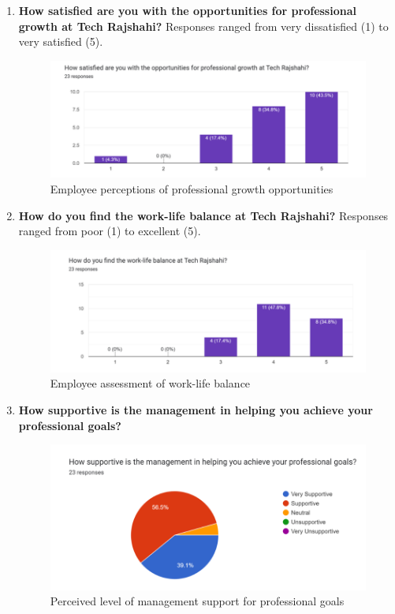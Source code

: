\documentclass[12pt,a4paper]{article}
\begin{document}
\begin{enumerate}
    \newpage
    \item \textbf{How satisfied are you with the opportunities for professional growth at Tech Rajshahi?}  Responses ranged from very dissatisfied (1) to very satisfied (5).
    \begin{figure}[H]
        \centering
        \includegraphics[width=\textwidth]{Fig/pg.png}
        \caption{Employee perceptions of professional growth opportunities}
        \label{fig:professional_growth}
    \end{figure}

    \item \textbf{How do you find the work-life balance at Tech Rajshahi?}  Responses ranged from poor (1) to excellent (5).
    \begin{figure}[H]
        \centering
        \includegraphics[width=\textwidth]{Fig/wlb.png}
        \caption{Employee assessment of work-life balance}
        \label{fig:work_life_balance}
    \end{figure}

    \item \textbf{How supportive is the management in helping you achieve your professional goals?}  
    \begin{figure}[H]
        \centering
        \includegraphics[width=\textwidth]{Fig/hpg.png}
        \caption{Perceived level of management support for professional goals}
        \label{fig:management_support}
    \end{figure}


\end{enumerate}
\end{document}
